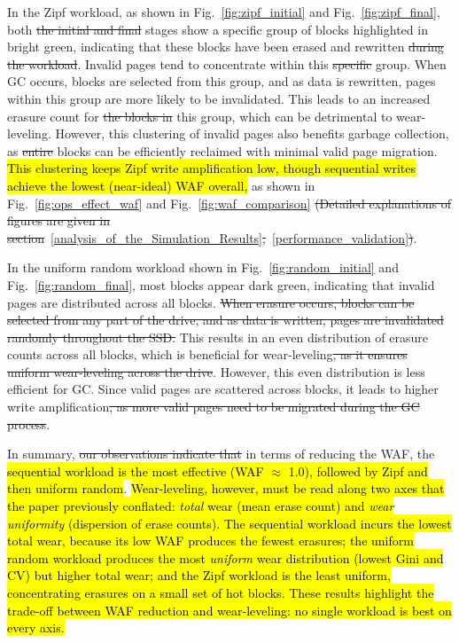 \documentclass{ieeeaccess}
\begin{document}
In the Zipf workload, as shown in Fig.~\ref{fig:zipf_initial} and Fig.~\ref{fig:zipf_final}, both \sout{the initial and final} stages show a specific group of blocks highlighted in bright green, indicating that these blocks have been erased and rewritten \sout{during the workload}. Invalid pages tend to concentrate within this \sout{specific} group. When GC occurs, blocks are selected from this group, and as data is rewritten, pages within this group are more likely to be invalidated. This leads to an increased erasure count for \sout{the blocks in} this group, which can be detrimental to wear-leveling. However, this clustering of invalid pages also benefits garbage collection, as \sout{entire} blocks can be efficiently reclaimed with minimal valid page migration. \hl{This clustering keeps Zipf write amplification low, though sequential writes achieve the lowest (near-ideal) WAF overall,} as shown in Fig.~\ref{fig:ops_effect_waf} and Fig.~\ref{fig:waf_comparison} \sout{(Detailed explanations of figures are given in section}~\ref{analysis_of_the_Simulation_Results}\sout{,}~\ref{performance_validation}\sout{)}.

In the uniform random workload shown in Fig.~\ref{fig:random_initial} and Fig.~\ref{fig:random_final}, most blocks appear dark green, indicating that invalid pages are distributed across all blocks. \sout{When erasure occurs, blocks can be selected from any part of the drive, and as data is written, pages are invalidated randomly throughout the SSD.} This results in an even distribution of erasure counts across all blocks, which is beneficial for wear-leveling\sout{, as it ensures uniform wear-leveling across the drive}. However, this even distribution is less efficient for GC. Since valid pages are scattered across blocks, it leads to higher write amplification\sout{, as more valid pages need to be migrated during the GC process}.


In summary, \sout{our observations indicate that} in terms of reducing the WAF, the \hl{sequential workload is the most effective (WAF $\approx$ 1.0), followed by Zipf and then uniform random}.
\hl{Wear-leveling, however, must be read along two axes that the paper previously conflated: \emph{total} wear (mean erase count) and \emph{wear uniformity} (dispersion of erase counts). The sequential workload incurs the lowest total wear, because its low WAF produces the fewest erasures; the uniform random workload produces the most \emph{uniform} wear distribution (lowest Gini and CV) but higher total wear; and the Zipf workload is the least uniform, concentrating erasures on a small set of hot blocks. These results highlight the trade-off between WAF reduction and wear-leveling: no single workload is best on every axis.}
\end{document}
